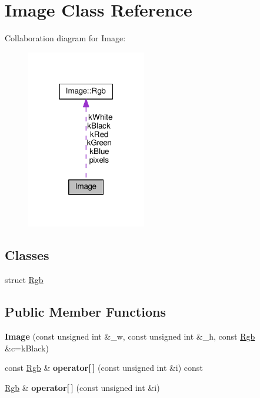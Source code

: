 \hypertarget{classImage}{}\section{Image Class Reference}
\label{classImage}


Collaboration diagram for Image\+:\nopagebreak
\begin{figure}[H]
\begin{center}
\leavevmode
\includegraphics[width=148pt]{classImage__coll__graph}
\end{center}
\end{figure}
\subsection*{Classes}
\begin{DoxyCompactItemize}
\item 
struct \hyperlink{structImage_1_1Rgb}{Rgb}
\end{DoxyCompactItemize}
\subsection*{Public Member Functions}
\begin{DoxyCompactItemize}
\item 
{\bfseries Image} (const unsigned int \&\+\_\+w, const unsigned int \&\+\_\+h, const \hyperlink{structImage_1_1Rgb}{Rgb} \&c=k\+Black)\hypertarget{classImage_a0ad0eb194da218c3402a187c1d339adb}{}\label{classImage_a0ad0eb194da218c3402a187c1d339adb}

\item 
const \hyperlink{structImage_1_1Rgb}{Rgb} \& {\bfseries operator\mbox{[}$\,$\mbox{]}} (const unsigned int \&i) const \hypertarget{classImage_a86c78da799bb20ff07924de0070f7909}{}\label{classImage_a86c78da799bb20ff07924de0070f7909}

\item 
\hyperlink{structImage_1_1Rgb}{Rgb} \& {\bfseries operator\mbox{[}$\,$\mbox{]}} (const unsigned int \&i)\hypertarget{classImage_a81577616707e17b4b1fdee5eb49151c8}{}\label{classImage_a81577616707e17b4b1fdee5eb49151c8}

\end{DoxyCompactItemize}
